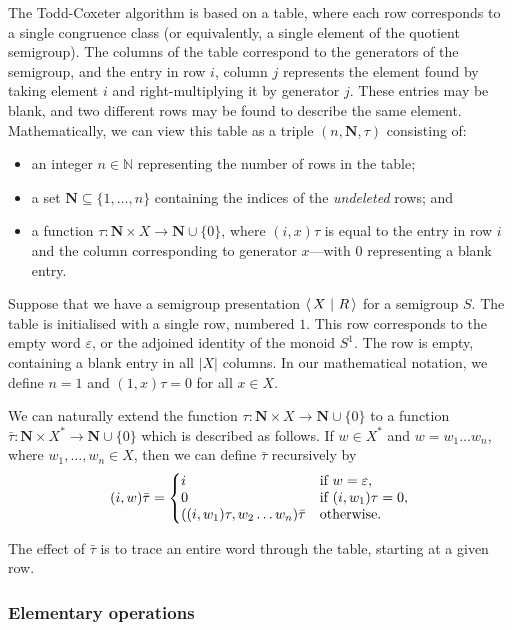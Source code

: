 The Todd-Coxeter algorithm is based on a table, where each row corresponds to a
single congruence class (or equivalently, a single element of the quotient
semigroup).  The columns of the table correspond to the generators of the
semigroup, and the entry in row $i$, column $j$ represents the element found by
taking element $i$ and right-multiplying it by generator $j$.  These entries may
be blank, and two different rows may be found to describe the same element.
Mathematically, we can view this table as a triple $(n, \mathbf{N}, \tau)$
consisting of:
\begin{itemize}
\item an integer $n \in \mathbb{N}$ representing the number of rows in the table;
\item a set $\mathbf{N} \subseteq \{1, \ldots, n\}$ containing the indices of the
  \textit{undeleted} rows; and
\item a function $\tau: \mathbf{N} \times X \to \mathbf{N} \cup \{0\}$, where
  $(i, x)\tau$ is equal to the entry in row $i$ and the column corresponding to
  generator $x$---with $0$ representing a blank entry.
\end{itemize}

Suppose that we have a semigroup presentation $\left\langle\,X ~\middle|~ R\,\right\rangle$ for a semigroup
$S$.  The table is initialised with a single row, numbered $1$.  This row
corresponds to the empty word $\varepsilon$, or the adjoined identity of the
monoid $S^1$.  The row is empty, containing a blank entry in all $|X|$ columns.
In our mathematical notation, we define $n=1$ and
$(1,x)\tau = 0$ for all $x \in X$.

We can naturally extend the function
$\tau: \mathbf{N} \times X \to \mathbf{N} \cup \{0\}$
to a function
$\bar{\tau}: \mathbf{N} \times X^* \to \mathbf{N} \cup \{0\}$
which is described as follows.
If $w \in X^*$ and $w=w_1 \ldots w_n$, where $w_1, \ldots, w_n \in X$,
then we can define $\bar\tau$ recursively by
$$
(i, w)\bar\tau = \left\{
\begin{matrix*}[l]
  i & \textnormal{if~} w=\varepsilon,\\
  0 & \textnormal{if~} (i, w_1)\tau=0,\\
  ((i, w_1)\tau, w_2 \ldots w_n)\bar\tau & \textnormal{otherwise}.
\end{matrix*} \right.
$$

The effect of $\bar\tau$ is to trace an entire word through the table, starting
at a given row.

\subsubsection{Elementary operations}

